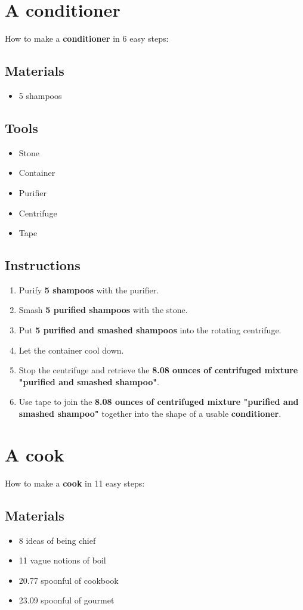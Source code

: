 \documentclass{article}
\begin{document}
\section{A conditioner}How to make a \textbf{conditioner} in 6 easy steps:

\subsection{Materials}\begin{itemize}
\item 
5 shampoos
\end{itemize}
\subsection{Tools}\begin{itemize}
\item 
Stone
\item 
Container
\item 
Purifier
\item 
Centrifuge
\item 
Tape
\end{itemize}
\subsection{Instructions}\begin{enumerate}
\item 
Purify \textbf{5 shampoos} with the purifier.
\item 
Smash \textbf{5 purified shampoos} with the stone.
\item 
Put \textbf{5 purified and smashed shampoos} into the rotating centrifuge.
\item 
Let the container cool down.
\item 
Stop the centrifuge and retrieve the \textbf{8.08 ounces of centrifuged mixture "purified and smashed shampoo"}.
\item 
Use tape to join the \textbf{8.08 ounces of centrifuged mixture "purified and smashed shampoo"} together into the shape of a usable \textbf{conditioner}.
\end{enumerate}
\newpage
\section{A cook}How to make a \textbf{cook} in 11 easy steps:

\subsection{Materials}\begin{itemize}
\item 
8 ideas of being chief
\item 
11 vague notions of boil
\item 
20.77 spoonful of cookbook
\item 
23.09 spoonful of gourmet
\end{itemize}
\end{document}
